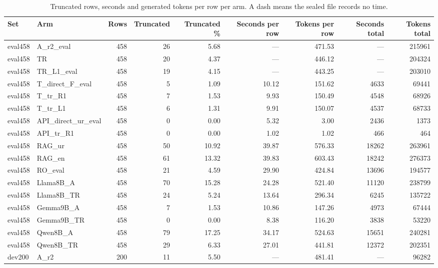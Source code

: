 \begin{table}[t]
\centering
\small
\caption{Truncated rows, seconds and generated tokens per row per arm. A dash means the sealed file records no time.}
\label{tab:d13-cost}
\begin{tabular}{llrrrrrrr}
\toprule
Set & Arm & Rows & Truncated & Truncated \% & Seconds per row & Tokens per row & Seconds total & Tokens total \\
\midrule
eval458 & A\_r2\_eval & 458 & 26 & 5.68 & — & 471.53 & — & 215961 \\
eval458 & TR & 458 & 20 & 4.37 & — & 446.12 & — & 204324 \\
eval458 & TR\_L1\_eval & 458 & 19 & 4.15 & — & 443.25 & — & 203010 \\
eval458 & T\_direct\_F\_eval & 458 & 5 & 1.09 & 10.12 & 151.62 & 4633 & 69441 \\
eval458 & T\_tr\_R1 & 458 & 7 & 1.53 & 9.93 & 150.49 & 4548 & 68926 \\
eval458 & T\_tr\_L1 & 458 & 6 & 1.31 & 9.91 & 150.07 & 4537 & 68733 \\
eval458 & API\_direct\_ur\_eval & 458 & 0 & 0.00 & 5.32 & 3.00 & 2436 & 1373 \\
eval458 & API\_tr\_R1 & 458 & 0 & 0.00 & 1.02 & 1.02 & 466 & 464 \\
eval458 & RAG\_ur & 458 & 50 & 10.92 & 39.87 & 576.33 & 18262 & 263961 \\
eval458 & RAG\_en & 458 & 61 & 13.32 & 39.83 & 603.43 & 18242 & 276373 \\
eval458 & RO\_eval & 458 & 21 & 4.59 & 29.90 & 424.84 & 13696 & 194577 \\
eval458 & Llama8B\_A & 458 & 70 & 15.28 & 24.28 & 521.40 & 11120 & 238799 \\
eval458 & Llama8B\_TR & 458 & 24 & 5.24 & 13.64 & 296.34 & 6245 & 135722 \\
eval458 & Gemma9B\_A & 458 & 7 & 1.53 & 10.86 & 147.26 & 4973 & 67444 \\
eval458 & Gemma9B\_TR & 458 & 0 & 0.00 & 8.38 & 116.20 & 3838 & 53220 \\
eval458 & Qwen8B\_A & 458 & 79 & 17.25 & 34.17 & 524.63 & 15651 & 240281 \\
eval458 & Qwen8B\_TR & 458 & 29 & 6.33 & 27.01 & 441.81 & 12372 & 202351 \\
dev200 & A\_r2 & 200 & 11 & 5.50 & — & 481.41 & — & 96282 \\

\end{tabular}
\end{table}
